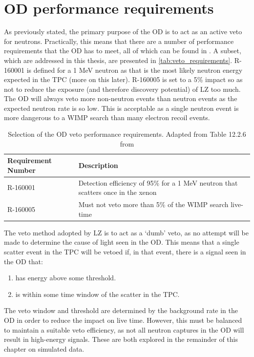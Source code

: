 \section{OD performance requirements}
\label{sec:simulated_od_requirements}
\par
As previously stated, the primary purpose of the OD is to act as an active veto for neutrons.
Practically, this means that there are a number of performance requirements that the OD has to meet, all of which can be found in \cite{LZ_TechnicalDesignReview_ref}.
A subset, which are addressed in this thesis, are presented in \autoref{tab:veto_requirements}.
R-160001 is defined for a 1 MeV neutron as that is the most likely neutron energy expected in the TPC (more on this later).
R-160005 is set to a 5\% impact so as not to reduce the exposure (and therefore discovery potential) of LZ too much.
The OD will always veto more non-neutron events than neutron events as the expected neutron rate is so low.
This is acceptable as a single neutron event is more dangerous to a WIMP search than many electron recoil events.
\begin{table}[]
    \centering
    \begin{tabular}{p{}p{}} %
    \hline
    {Requirement Number} & {Description} \\ \hline
    R-160001             & Detection efficiency of 95\% for a 1 MeV neutron that scatters once in the xenon \\
    R-160005             & Must not veto more than 5\% of the WIMP search live-time
    \end{tabular}
    \caption{Selection of the OD veto performance requirements. Adapted from Table 12.2.6 from \cite{LZ_TechnicalDesignReview_ref}}
    \label{tab:veto_requirements}
\end{table} 

\par
The veto method adopted by LZ is to act as a `dumb' veto, as no attempt will be made to determine the cause of light seen in the OD.
This means that a single scatter event in the TPC will be vetoed if, in that event, there is a signal seen in the OD that:
\begin{enumerate}
    \item has energy above some threshold.
    \item is within some time window of the scatter in the TPC. 
\end{enumerate}
The veto window and threshold are determined by the background rate in the OD in order to reduce the impact on live time.
However, this must be balanced to maintain a suitable veto efficiency, as not all neutron captures in the OD will result in high-energy signals.
These are both explored in the remainder of this chapter on simulated data.

